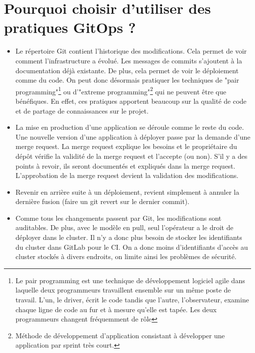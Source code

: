 \documentclass[11pt,fleqn]{book} %
\begin{document}
\section{Pourquoi choisir d'utiliser des pratiques GitOps ? }
\begin{itemize}
    \item Le répertoire Git contient l'historique des modifications. Cela permet de voir comment l'infrastructure a évolué. Les messages de commits s'ajoutent à la documentation déjà existante. De plus, cela permet de voir le déploiement comme du code. On peut donc désormais pratiquer les techniques de "pair programming"\footnote{Le pair programming est une technique de développement logiciel agile dans laquelle deux programmeurs travaillent ensemble sur un même poste de travail. L'un, le driver, écrit le code tandis que l'autre, l'observateur, examine chaque ligne de code au fur et à mesure qu'elle est tapée. Les deux programmeurs changent fréquemment de rôle
} ou d'"extreme programming"\footnote{Méthode de développement d'application consistant à développer une application par sprint très court.} qui ne peuvent être que bénéfiques. En effet, ces pratiques apportent beaucoup sur la qualité de code et de partage de connaissances sur le projet.
    \item La mise en production d'une application se déroule comme le reste du code. Une nouvelle version d'une application à déployer passe par la demande d'une merge request. La merge request explique les besoins et le propriétaire du dépôt vérifie la validité de la merge request et l'accepte (ou non). S’il y a des points à revoir, ils seront documentés et expliqués dans la merge request. L’approbation de la merge request devient la validation des modifications.
    \item Revenir en arrière suite à un déploiement, revient simplement à annuler la dernière fusion (faire un git revert sur le dernier commit).
    \item Comme tous les changements passent par Git, les modifications sont auditables. De plus, avec le  modèle en pull, seul l’opérateur a le droit de déployer dans le cluster. Il n'y a donc plus besoin de stocker les identifiants du cluster dans GitLab pour le CI. On a donc moins d'identifiants d'accès au cluster stockés à divers endroits, on limite ainsi les problèmes de sécurité.
\end{itemize}
\end{document}
